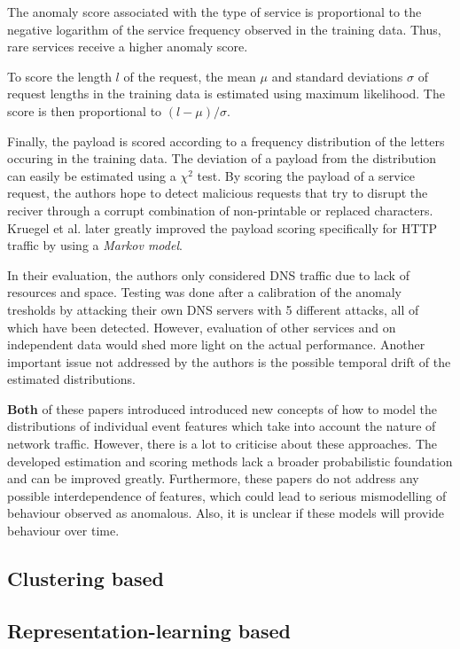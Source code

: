 \documentclass[a4paper,12pt,twoside]{report}
\begin{document}
The anomaly score associated with the type of service is proportional to the negative logarithm of the service frequency observed in the training data. Thus, rare services receive a higher anomaly score. 

To score the length $l$ of the request, the mean $\mu$ and standard deviations $\sigma$ of request lengths in the training data is estimated using maximum likelihood. The score is then proportional to $(l-\mu)/\sigma$.

Finally, the payload is scored according to a frequency distribution of the letters occuring in the training data. The deviation of a payload from the distribution can easily be estimated using a $\chi^2$ test. By scoring the payload of a service request, the authors hope to detect malicious requests that try to disrupt the reciver through a corrupt combination of non-printable or replaced characters. Kruegel et al. \cite{kruegel2005multi} later greatly improved the payload scoring specifically for HTTP traffic by using a \textit{Markov model}.


In their evaluation, the authors only considered DNS traffic due to lack of resources and space. Testing was done after a calibration of the anomaly tresholds by attacking their own DNS servers with 5 different attacks, all of which have been detected. However, evaluation of other services and on independent data would shed more light on the actual performance. Another important issue not addressed by the authors is the possible temporal drift of the estimated distributions.



\textbf{Both} of these papers introduced introduced new concepts of how to model the distributions of individual event features which take into account the nature of network traffic. However, there is a lot to criticise about these approaches. The developed estimation and scoring methods lack a broader probabilistic foundation and can be improved greatly. Furthermore, these papers do not address any possible interdependence of features, which could lead to serious mismodelling of behaviour observed as anomalous. Also, it is unclear if these models will provide behaviour over time.




\subsection{Clustering based}

\subsection{Representation-learning based}
\end{document}
